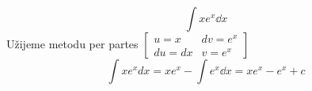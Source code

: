 \begin{mdframed}[style=mdexam]
  \begin{example}\label{mai:exam112}
    \begin{equation}\label{mai:exam016_001}
      \int{xe^x\dd{x}}
    \end{equation}
    Užijeme metodu per partes 
      \(\left[\begin{array}{cc}
              u=x   & dv=e^x \\
              du=dx & v=e^x
        \end{array}\right]\) 
    \begin{equation*}
      \int{xe^xdx} = xe^x-\int{e^x\dd{x}} = xe^x - e^x+ c
    \end{equation*}
  \end{example}
\end{mdframed}